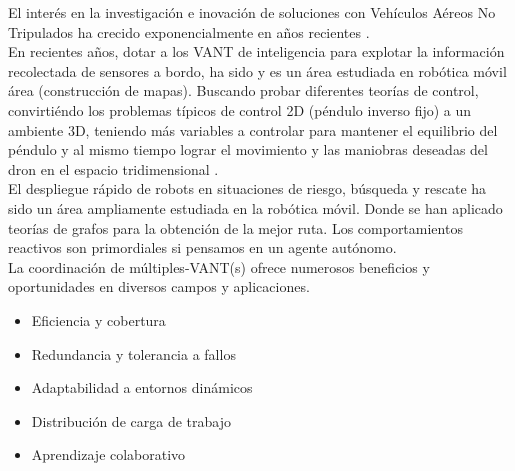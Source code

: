 \documentclass[11pt,epsf,times]{article}
\begin{document}
  El inter\'{e}s en la investigaci\'{o}n e inovaci\'{o}n de soluciones con Veh\'{i}culos A\'{e}reos No Tripulados ha crecido exponencialmente en a\~{n}os recientes \cite{Daponte2015,UAVPRACTICAL2023,GUPTA2016,VEGETACION2017,ROADS2017}.\\
  
  En recientes a\~{n}os, dotar a los VANT de inteligencia para explotar la informaci\'{o}n recolectada de sensores a bordo, ha sido y es un \'{a}rea estudiada en rob\'{o}tica m\'{o}vil \'{a}rea (construcci\'{o}n de mapas)\cite{SHUKLA2016490}. Buscando probar diferentes teor\'{i}as de control, convirti\'{e}ndo los problemas t\'{i}picos de control 2D (p\'{e}ndulo inverso fijo) a un ambiente 3D, teniendo m\'{a}s variables a controlar para mantener el equilibrio del p\'{e}ndulo y al mismo tiempo lograr el movimiento y las maniobras deseadas del dron en el espacio tridimensional \cite{PENDU2011}.\\
  
  El despliegue r\'{a}pido de robots en situaciones de riesgo, b\'{u}squeda y rescate ha sido un \'{a}rea ampliamente estudiada en la rob\'{o}tica m\'{o}vil. Donde se han aplicado teor\'{i}as de grafos para la obtenci\'{o}n de la mejor ruta. Los comportamientos reactivos son primordiales si pensamos en un agente aut\'{o}nomo.\\ %

La coordinaci\'{o}n de m\'{u}ltiples-VANT(s) ofrece numerosos beneficios y oportunidades en diversos campos y aplicaciones.

\begin{multicols}{2}
  \begin{itemize}
  \item Eficiencia y cobertura
  \item Redundancia y tolerancia a fallos
  \item Adaptabilidad a entornos din\'{a}micos
  \item Distribuci\'{o}n de carga de trabajo
  \item Aprendizaje colaborativo
  \end{itemize}
\end{multicols}

\newpage
\end{document}
